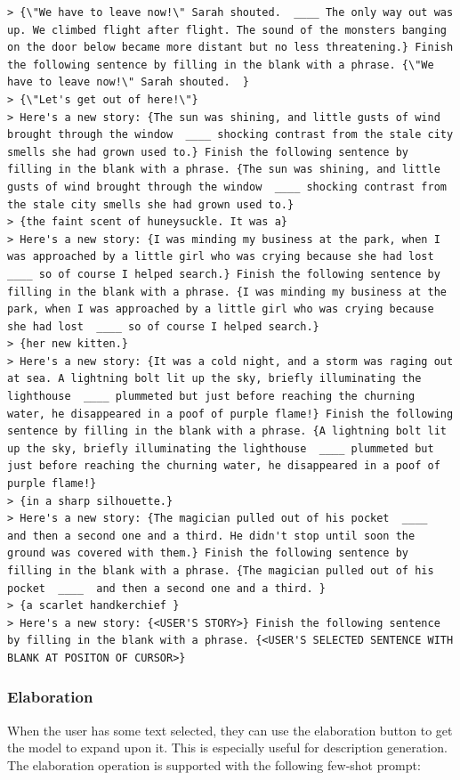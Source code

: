 \begin{lstlisting}
> {\"We have to leave now!\" Sarah shouted.  ____ The only way out was up. We climbed flight after flight. The sound of the monsters banging on the door below became more distant but no less threatening.} Finish the following sentence by filling in the blank with a phrase. {\"We have to leave now!\" Sarah shouted.  }
> {\"Let's get out of here!\"}
> Here's a new story: {The sun was shining, and little gusts of wind brought through the window  ____ shocking contrast from the stale city smells she had grown used to.} Finish the following sentence by filling in the blank with a phrase. {The sun was shining, and little gusts of wind brought through the window  ____ shocking contrast from the stale city smells she had grown used to.}
> {the faint scent of huneysuckle. It was a}
> Here's a new story: {I was minding my business at the park, when I was approached by a little girl who was crying because she had lost  ____ so of course I helped search.} Finish the following sentence by filling in the blank with a phrase. {I was minding my business at the park, when I was approached by a little girl who was crying because she had lost  ____ so of course I helped search.}
> {her new kitten.}
> Here's a new story: {It was a cold night, and a storm was raging out at sea. A lightning bolt lit up the sky, briefly illuminating the lighthouse  ____ plummeted but just before reaching the churning water, he disappeared in a poof of purple flame!} Finish the following sentence by filling in the blank with a phrase. {A lightning bolt lit up the sky, briefly illuminating the lighthouse  ____ plummeted but just before reaching the churning water, he disappeared in a poof of purple flame!}
> {in a sharp silhouette.}
> Here's a new story: {The magician pulled out of his pocket  ____  and then a second one and a third. He didn't stop until soon the ground was covered with them.} Finish the following sentence by filling in the blank with a phrase. {The magician pulled out of his pocket  ____  and then a second one and a third. }
> {a scarlet handkerchief }
> Here's a new story: {<USER'S STORY>} Finish the following sentence by filling in the blank with a phrase. {<USER'S SELECTED SENTENCE WITH BLANK AT POSITON OF CURSOR>}
\end{lstlisting}

\subsubsection{Elaboration}
When the user has some text selected, they can use the elaboration button to get the model to expand upon it.
This is especially useful for description generation.
The elaboration operation is supported with the following few-shot prompt:

